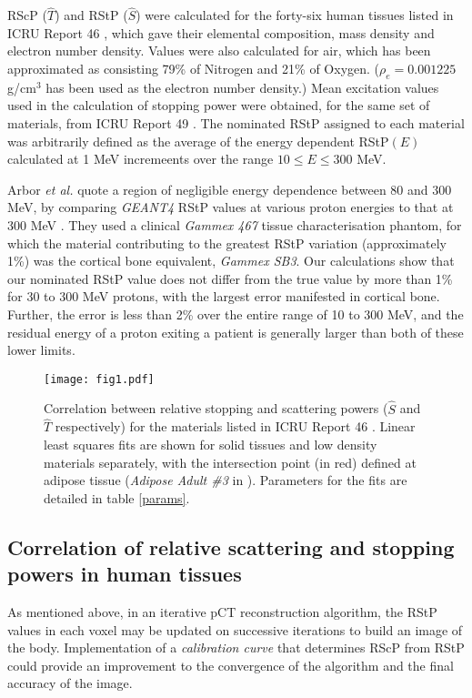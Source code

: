 \documentclass[preprint,times]{elsarticle}
\newcommand{\Tab}[1]{table #1} %
\begin{document}
RScP ($\hat{T}$) and RStP ($\hat{S}$) were calculated for the forty-six human tissues listed in ICRU Report 46 \citep{ICRU46}, which gave their elemental composition, mass density and electron number density. Values were also calculated for air, which has been approximated as consisting 79\% of Nitrogen and 21\% of Oxygen. ($\rho_e = 0.001225$ g/cm$^3$ has been used as the electron number density.) Mean excitation values used in the calculation of stopping power were obtained, for the same set of materials, from ICRU Report 49 \citep{ICRU49}. The nominated RStP assigned to each material was arbitrarily defined as the average of the energy dependent RStP$(E)$ calculated at 1 MeV incremeents over the range $10\leq E \leq 300$ MeV.

Arbor \emph{et al.} quote a region of negligible energy dependence between 80 and 300 MeV, by comparing \emph{GEANT4} RStP values at various proton energies to that at 300 MeV \citep{Arbor2015}. They used a clinical \emph{Gammex 467} tissue characterisation phantom, for which the material contributing to the greatest RStP variation (approximately 1\%) was the cortical bone equivalent, \emph{Gammex SB3}. Our calculations show that our nominated RStP value does not differ from the true value by more than 1\% for 30 to 300 MeV protons, with the largest error manifested in cortical bone. Further, the error is less than 2\% over the entire range of 10 to 300 MeV, and the residual energy of a proton exiting a patient is generally larger than both of these lower limits.

\begin{figure}[t]
\centering
\texttt{[image: fig1.pdf]}
\caption{Correlation between relative stopping and scattering powers ($\hat{S}$ and $\hat{T}$ respectively) for the materials listed in ICRU Report 46 \citep{ICRU46}. Linear least squares fits are shown for solid tissues and low density materials separately, with the intersection point (in red) defined at adipose tissue (\emph{Adipose Adult \#3} in \citep{ICRU46}). Parameters for the fits are detailed in \Tab{\ref{params}.}}\label{relSrelT}
\end{figure}

\subsection{Correlation of relative scattering and stopping powers in human tissues}\label{correlationsec}

As mentioned above, in an iterative pCT reconstruction algorithm, the RStP values in each voxel may be updated on successive iterations to build an image of the body. Implementation of a \emph{calibration curve} that determines RScP from RStP could provide an improvement to the convergence of the algorithm and the final accuracy of the image.
\end{document}

